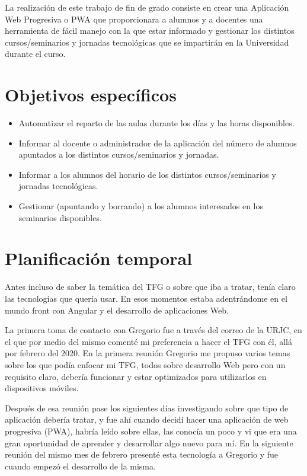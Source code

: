 \documentclass[a4paper, 12pt]{book}
\begin{document}
La realización de este trabajo de fin de grado consiste en crear una Aplicación Web Progresiva o PWA que proporcionara a alumnos y a docentes una herramienta de fácil manejo con la que estar informado y gestionar los distintos cursos/seminarios y jornadas tecnológicas que se impartirán en la Universidad durante el curso.


\section{Objetivos específicos}
\label{sec:objetivos-especificos}

\begin{itemize}
  \item Automatizar el reparto de las aulas durante los días y las horas disponibles.
  \item Informar al docente o administrador de la aplicación del número de alumnos apuntados a los distintos cursos/seminarios y jornadas.
  \item Informar a los alumnos del horario de los distintos cursos/seminarios y jornadas tecnológicas.
  \item Gestionar (apuntando y borrando) a los alumnos interesados en los seminarios disponibles.
\end{itemize}

\clearpage

\section{Planificación temporal}
\label{sec:planificacion-temporal}

Antes incluso de saber la temática del TFG o sobre que iba a tratar, tenía claro las tecnologías que quería usar. En esos momentos estaba adentrándome en el mundo front con Angular y el desarrollo de aplicaciones Web.

La primera toma de contacto con Gregorio fue a través del correo de la URJC, en el que por medio del mismo comenté mi preferencia a hacer el TFG con él, allá por febrero del 2020. En la primera reunión Gregorio me propuso varios temas sobre los que podía enfocar mi TFG, todos sobre desarrollo Web pero con un requisito claro, debería funcionar y estar optimizados para utilizarlos en dispositivos móviles.

Después de esa reunión pase los siguientes días investigando sobre que tipo de aplicación debería tratar, y fue ahí cuando decidí hacer una aplicación de web progresiva (PWA), habría leído sobre ellas, las conocía un poco y vi que era una gran oportunidad de aprender y desarrollar algo nuevo para mí. En la siguiente reunión del mismo mes de febrero presenté esta tecnología a Gregorio y fue cuando empezó el desarrollo de la misma.
\end{document}
